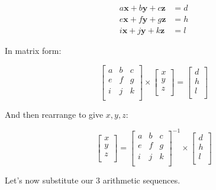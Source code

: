 \documentclass[12pt]{article}
\begin{document}
			
	\begin{align}
		a\bm{x} + b\bm{y} + c\bm{z} &= d \\
		e\bm{x} + f\bm{y} + g\bm{z} &= h \\
		i\bm{x} + j\bm{y} + k\bm{z} & = l
	\end{align}
	
	In matrix form:
	
	\begin{equation}
		\left [ \begin{array}{ccc} 
			a & b & c \\
			e & f & g \\
			i & j & k \\
		\end{array} \right ] \times
		\left [ \begin{array}{c}
			x \\
			y \\
			z \\
		\end{array}\right ] = 
		\left [ \begin{array}{c}
			d \\
			h \\
			l \\
		\end{array}\right ]
	\end{equation}

	And then rearrange to give \(x, y, z\):
	
	
	\begin{equation}
		\left [ \begin{array}{c}
			x \\
			y \\
			z \\
		\end{array}\right ] = 
		\left [ \begin{array}{ccc} 
			a & b & c \\
			e & f & g \\
			i & j & k \\
		\end{array} \right ]^{-1} \times	
		\left [ \begin{array}{c}
			d \\
			h \\
			l \\
		\end{array}\right ]
	\end{equation}

	Let's now substitute our 3 arithmetic sequences.
	
\end{document}
